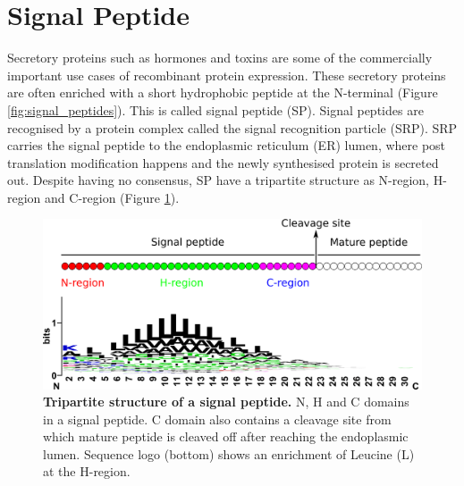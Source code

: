 \section{Signal Peptide}
Secretory proteins such as hormones and toxins are some of the commercially important use cases of recombinant protein expression. These secretory proteins are often enriched with a short hydrophobic peptide at the N-terminal (Figure \ref{fig:signal_peptides}). This is called signal peptide (SP). Signal peptides are recognised by a protein complex called the signal recognition particle (SRP). SRP carries the signal peptide to the endoplasmic reticulum (ER) lumen, where post translation modification happens and the newly synthesised protein is secreted out.  Despite having no consensus, SP have a tripartite structure as N-region, H-region and C-region \cite{Von_Heijne1985-qv} (Figure \ref{fig:signal_peptide_structure}). 

\begin{figure}[htbp!]
\center
\includegraphics[width=1\textwidth]{chapters/Introduction/SignalPeptide/Figures/signal_peptide.png}
\caption[Tripartite structure of a signal peptide.]{\textbf{Tripartite structure of a signal peptide.} N, H and C domains in a signal peptide. C domain also contains a cleavage site from which mature peptide is cleaved off after reaching the endoplasmic lumen. Sequence logo (bottom) shows an enrichment of Leucine (L) at the H-region.}
\label{fig:signal_peptide_structure}
\end{figure}


